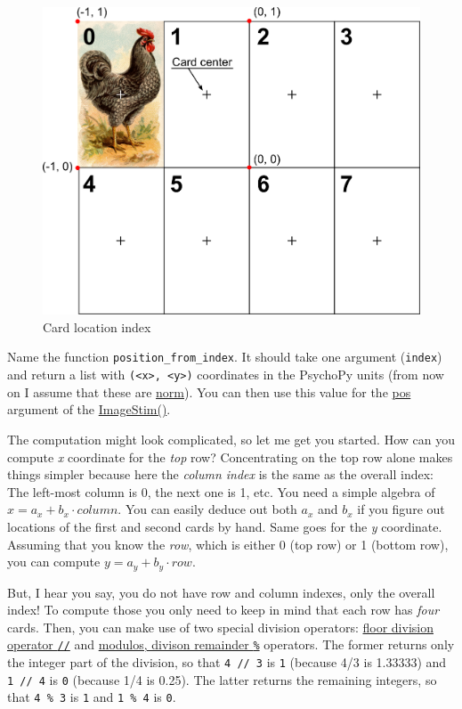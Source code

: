 \documentclass[
]{book}
\begin{document}
\begin{figure}
\centering
\includegraphics[width=1\textwidth,height=\textheight]{images/memory-location-index.png}
\caption{Card location index}
\end{figure}

Name the function \texttt{position\_from\_index}. It should take one argument (\texttt{index}) and return a list with \texttt{(\textless{}x\textgreater{},\ \textless{}y\textgreater{})} coordinates in the PsychoPy units (from now on I assume that these are \protect\hyperlink{psychopy-units-norm}{norm}). You can then use this value for the \href{https://psychopy.org/api/visual/imagestim.html\#psychopy.visual.ImageStim.pos}{pos} argument of the \href{https://psychopy.org/api/visual/imagestim.html\#imagestim}{ImageStim()}.

The computation might look complicated, so let me get you started. How can you compute \emph{x} coordinate for the \emph{top} row? Concentrating on the top row alone makes things simpler because here the \emph{column index} is the same as the overall index: The left-most column is 0, the next one is 1, etc. You need a simple algebra of \(x = a_x + b_x \cdot column\). You can easily deduce out both \(a_x\) and \(b_x\) if you figure out locations of the first and second cards by hand. Same goes for the \emph{y} coordinate. Assuming that you know the \emph{row}, which is either 0 (top row) or 1 (bottom row), you can compute \(y = a_y + b_y \cdot row\).

But, I hear you say, you do not have row and column indexes, only the overall index! To compute those you only need to keep in mind that each row has \emph{four} cards. Then, you can make use of two special division operators: \href{https://python-reference.readthedocs.io/en/latest/docs/operators/floor_division.html}{floor division operator \texttt{//}} and \href{https://python-reference.readthedocs.io/en/latest/docs/operators/modulus.html}{modulos, divison remainder \texttt{\%}} operators. The former returns only the integer part of the division, so that \texttt{4\ //\ 3} is \texttt{1} (because 4/3 is 1.33333) and \texttt{1\ //\ 4} is \texttt{0} (because 1/4 is 0.25). The latter returns the remaining integers, so that \texttt{4\ \%\ 3} is \texttt{1} and \texttt{1\ \%\ 4} is \texttt{0}.
\end{document}
